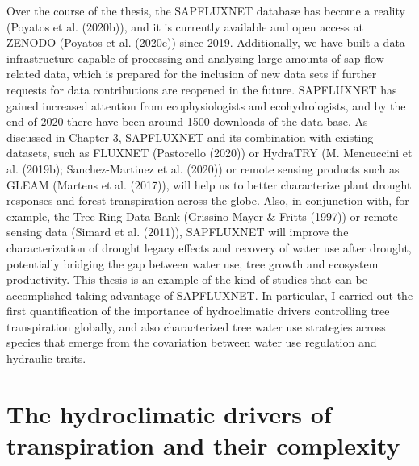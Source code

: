 \documentclass[11pt,twoside]{reedthesis}
\begin{document}
Over the course of the thesis, the SAPFLUXNET database has become a
reality (Poyatos et al. (2020b)), and it is currently available and open
access at ZENODO (Poyatos et al. (2020c)) since 2019. Additionally, we
have built a data infrastructure capable of processing and analysing
large amounts of sap flow related data, which is prepared for the
inclusion of new data sets if further requests for data contributions
are reopened in the future. SAPFLUXNET has gained increased attention
from ecophysiologists and ecohydrologists, and by the end of 2020 there
have been around 1500 downloads of the data base. As discussed in
Chapter 3, SAPFLUXNET and its combination with existing datasets, such
as FLUXNET (Pastorello (2020)) or HydraTRY (M. Mencuccini et al.
(2019b); Sanchez-Martinez et al. (2020)) or remote sensing products such
as GLEAM (Martens et al. (2017)), will help us to better characterize
plant drought responses and forest transpiration across the globe. Also,
in conjunction with, for example, the Tree-Ring Data Bank
(Grissino-Mayer \& Fritts (1997)) or remote sensing data (Simard et al.
(2011)), SAPFLUXNET will improve the characterization of drought legacy
effects and recovery of water use after drought, potentially bridging
the gap between water use, tree growth and ecosystem productivity. This
thesis is an example of the kind of studies that can be accomplished
taking advantage of SAPFLUXNET. In particular, I carried out the first
quantification of the importance of hydroclimatic drivers controlling
tree transpiration globally, and also characterized tree water use
strategies across species that emerge from the covariation between water
use regulation and hydraulic traits.\par

\section{The hydroclimatic drivers of transpiration and their
complexity}\label{the-hydroclimatic-drivers-of-transpiration-and-their-complexity}
\end{document}
